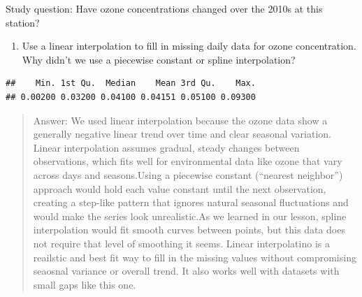 \documentclass[
]{article}
\newenvironment{Shaded}{\begin{snugshade}}{\end{snugshade}}
\newcommand{\AttributeTok}[1]{\textcolor[rgb]{0.13,0.29,0.53}{#1}}
\newcommand{\CommentTok}[1]{\textcolor[rgb]{0.56,0.35,0.01}{\textit{#1}}}
\newcommand{\FloatTok}[1]{\textcolor[rgb]{0.00,0.00,0.81}{#1}}
\newcommand{\FunctionTok}[1]{\textcolor[rgb]{0.13,0.29,0.53}{\textbf{#1}}}
\newcommand{\NormalTok}[1]{#1}
\newcommand{\OtherTok}[1]{\textcolor[rgb]{0.56,0.35,0.01}{#1}}
\newcommand{\SpecialCharTok}[1]{\textcolor[rgb]{0.81,0.36,0.00}{\textbf{#1}}}
\providecommand{\tightlist}{%
  \setlength{\itemsep}{0pt}\setlength{\parskip}{0pt}}
\begin{document}
Study question: Have ozone concentrations changed over the 2010s at this
station?

\begin{enumerate}
\def\labelenumi{\arabic{enumi}.}
\setcounter{enumi}{7}
\tightlist
\item
  Use a linear interpolation to fill in missing daily data for ozone
  concentration. Why didn't we use a piecewise constant or spline
  interpolation?
\end{enumerate}

\begin{Shaded}
\end{Shaded}

\begin{verbatim}
##    Min. 1st Qu.  Median    Mean 3rd Qu.    Max. 
## 0.00200 0.03200 0.04100 0.04151 0.05100 0.09300
\end{verbatim}

\begin{quote}
Answer: We used linear interpolation because the ozone data show a
generally negative linear trend over time and clear seasonal variation.
Linear interpolation assumes gradual, steady changes between
observations, which fits well for environmental data like ozone that
vary across days and seasons.Using a piecewise constant (``nearest
neighbor'') approach would hold each value constant until the next
observation, creating a step-like pattern that ignores natural seasonal
fluctuations and would make the series look unrealistic.As we learned in
our lesson, spline interpolation would fit smooth curves between points,
but this data does not require that level of smoothing it seems. Linear
interpolatino is a reailstic and best fit way to fill in the missing
values without compromising seaosnal variance or overall trend. It also
works well with datasets with small gaps like this one.
\end{quote}
\end{document}
